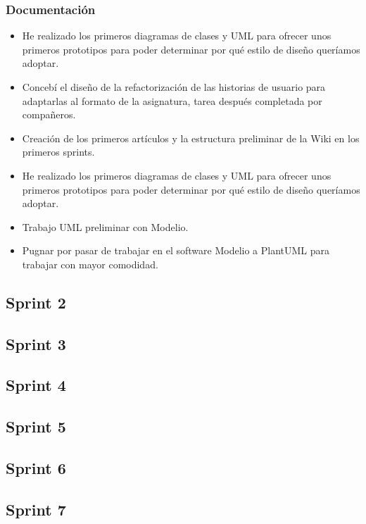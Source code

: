 \documentclass{article}
\begin{document}
\subsubsection*{Documentación}
\begin{itemize}
\item He realizado los primeros diagramas de clases y UML para ofrecer unos primeros prototipos para poder determinar por qué estilo de diseño queríamos adoptar.
\item Concebí el diseño de la refactorización de las historias de usuario para adaptarlas al formato de la asignatura, tarea después completada por compañeros.
\item Creación de los primeros artículos y la estructura preliminar de la Wiki en los primeros sprints.
\item He realizado los primeros diagramas de clases y UML para ofrecer unos primeros prototipos para poder determinar por qué estilo de diseño queríamos adoptar.
\item Trabajo UML preliminar con Modelio.
\item Pugnar por pasar de trabajar en el software Modelio a PlantUML para trabajar con mayor comodidad.
\end{itemize}

\subsection*{Sprint 2}
\subsection*{Sprint 3}
\subsection*{Sprint 4}
\subsection*{Sprint 5}
\subsection*{Sprint 6}
\subsection*{Sprint 7}
\end{document}
